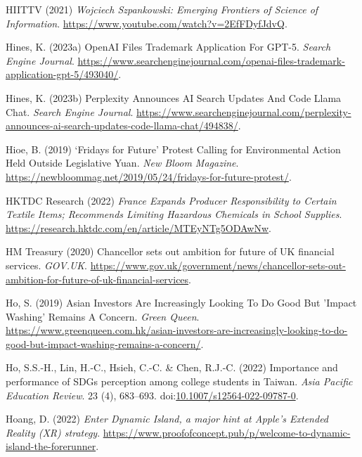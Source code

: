 \documentclass[
  letterpaper,
  DIV=11,
  numbers=noendperiod]{scrartcl}
\newlength{\cslhangindent}
\newenvironment{CSLReferences}[2] %
 {\begin{list}{}{%
  \setlength{\itemindent}{0pt}
  \setlength{\leftmargin}{0pt}
  \setlength{\parsep}{0pt}
  \ifodd #1
   \setlength{\leftmargin}{\cslhangindent}
   \setlength{\itemindent}{-1\cslhangindent}
  \fi
  \setlength{\itemsep}{#2\baselineskip}}}
 {\end{list}}
\begin{document}
\begin{CSLReferences}{0}{1}
HIITTV (2021) \emph{Wojciech {Szpankowski}: {Emerging Frontiers} of
{Science} of {Information}}.
\url{https://www.youtube.com/watch?v=2EfFDyfJdvQ}.

Hines, K. (2023a) {OpenAI Files Trademark Application For GPT-5}.
\emph{Search Engine Journal}.
\url{https://www.searchenginejournal.com/openai-files-trademark-application-gpt-5/493040/}.

Hines, K. (2023b) Perplexity {Announces AI Search Updates And Code Llama
Chat}. \emph{Search Engine Journal}.
\url{https://www.searchenginejournal.com/perplexity-announces-ai-search-updates-code-llama-chat/494838/}.

Hioe, B. (2019) {`{Fridays} for {Future}'} {Protest Calling} for
{Environmental Action Held Outside Legislative Yuan}. \emph{New Bloom
Magazine}.
\url{https://newbloommag.net/2019/05/24/fridays-for-future-protest/}.

HKTDC Research (2022) \emph{France {Expands Producer Responsibility} to
{Certain Textile Items}; {Recommends Limiting Hazardous Chemicals} in
{School Supplies}}.
\url{https://research.hktdc.com/en/article/MTEyNTg5ODAwNw}.

HM Treasury (2020) Chancellor sets out ambition for future of {UK}
financial services. \emph{GOV.UK}.
\url{https://www.gov.uk/government/news/chancellor-sets-out-ambition-for-future-of-uk-financial-services}.

Ho, S. (2019) Asian {Investors Are Increasingly Looking To Do Good But}
'{Impact Washing}' {Remains A Concern}. \emph{Green Queen}.
\url{https://www.greenqueen.com.hk/asian-investors-are-increasingly-looking-to-do-good-but-impact-washing-remains-a-concern/}.

Ho, S.S.-H., Lin, H.-C., Hsieh, C.-C. \& Chen, R.J.-C. (2022) Importance
and performance of {SDGs} perception among college students in {Taiwan}.
\emph{Asia Pacific Education Review}. 23 (4), 683--693.
doi:\href{https://doi.org/10.1007/s12564-022-09787-0}{10.1007/s12564-022-09787-0}.

Hoang, D. (2022) \emph{Enter {Dynamic Island}, a major hint at {Apple}'s
{Extended Reality} ({XR}) strategy}.
\url{https://www.proofofconcept.pub/p/welcome-to-dynamic-island-the-forerunner}.


\end{CSLReferences}
\end{document}
